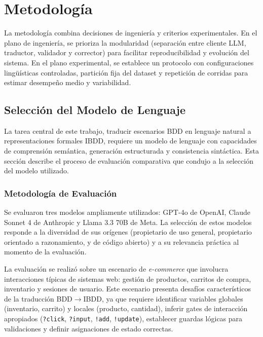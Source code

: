 \chapter{Metodología}

La metodología combina decisiones de ingeniería y criterios experimentales. En el plano de ingeniería, se prioriza la modularidad (separación entre cliente LLM, traductor, validador y corrector) para facilitar reproducibilidad y evolución del sistema. En el plano experimental, se establece un protocolo con configuraciones lingüísticas controladas, partición fija del dataset y repetición de corridas para estimar desempeño medio y variabilidad.

\section{Selección del Modelo de Lenguaje}
\label{sec:seleccion-modelo}

La tarea central de este trabajo, traducir escenarios BDD en lenguaje natural a representaciones formales IBDD, requiere un modelo de lenguaje con capacidades de comprensión semántica, generación estructurada y consistencia sintáctica. Esta sección describe el proceso de evaluación comparativa que condujo a la selección del modelo utilizado.

\subsection{Metodología de Evaluación}

Se evaluaron tres modelos ampliamente utilizados: GPT-4o de OpenAI, Claude Sonnet 4 de Anthropic y Llama 3.3 70B de Meta. La selección de estos modelos responde a la diversidad de sus orígenes (propietario de uso general, propietario orientado a razonamiento, y de código abierto) y a su relevancia práctica al momento de la evaluación.

La evaluación se realizó sobre un escenario de \textit{e-commerce} que involucra interacciones típicas de sistemas web: gestión de productos, carritos de compra, inventario y sesiones de usuario. Este escenario presenta desafíos característicos de la traducción BDD$\rightarrow$IBDD, ya que requiere identificar variables globales (inventario, carrito) y locales (producto, cantidad), inferir gates de interacción apropiados (\texttt{?click}, \texttt{?input}, \texttt{!add}, \texttt{!update}), establecer guardas lógicas para validaciones y definir asignaciones de estado correctas.


